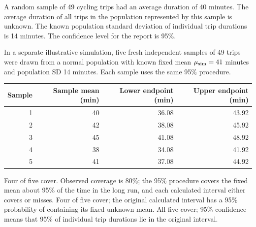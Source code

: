 
\InformationTask

\IntervalTask

\CoverageTask

\clearpage
{}
\vspace{-8mm}

A random sample of 49 cycling trips had an average duration of 40 minutes. The average duration of all trips in the population represented by this sample is unknown. The known population standard deviation of individual trip durations is 14 minutes. The confidence level for the report is 95\%.

In a separate illustrative simulation, five fresh independent samples of 49 trips were drawn from a normal population with known fixed mean $\mu_{\rm sim}=41$ minutes and population SD 14 minutes. Each sample uses the same 95\% procedure.
\begin{center}\begin{tabular}{@{}rrrr@{}}\toprule
Sample&Sample mean (min)&Lower endpoint (min)&Upper endpoint (min)\\\midrule
1&40&36.08&43.92\\
2&42&38.08&45.92\\
3&45&41.08&48.92\\
4&38&34.08&41.92\\
5&41&37.08&44.92\\\bottomrule
\end{tabular}\end{center}
{Four of five cover. Observed coverage is 80\%; the 95\% procedure covers the fixed mean about 95\% of the time in the long run, and each calculated interval either covers or misses.}
{Four of five cover; the original calculated interval has a 95\% probability of containing its fixed unknown mean.}
{All five cover; 95\% confidence means that 95\% of individual trip durations lie in the original interval.}

\vspace{-3mm}
